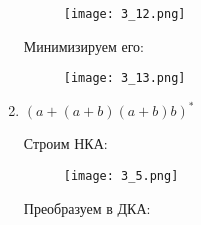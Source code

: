\documentclass[12pt, a4paper]{article}
\begin{document}
\begin{enumerate}
    \begin{figure}[H]
        \centering
        \texttt{[image: 3\_12.png]}
    \end{figure}

Минимизируем его:

\begin{comment}
digraph {
    rankdir="LR"
    "" [shape=point]
    q1 [shape=circle]
    "{q6,q8; q2,q8; q6}" [shape=doublecircle]
    "q3,q7; q5" [shape=circle]
    q4 [shape=circle]

    "" -> q1
    q1 -> "{q6,q8; q2,q8; q6}"  [label="a"]
    "{q6,q8; q2,q8; q6}" -> "q3,q7; q5" [label="a"]
    "q3,q7; q5" -> "{q6,q8; q2,q8; q6}" [label="b"]
    "q3,q7; q5" -> q4 [label="a"]
    q4 -> "q3,q7; q5" [label="b"]
}
\end{comment}

    \begin{figure}[H]
        \centering
        \texttt{[image: 3\_13.png]}
    \end{figure}


    \item \((a+(a+b)(a+b)b)^*\)
    
\begin{comment}
digraph {
    rankdir="LR"
    "" [shape=point]
    q1 [shape=doublecircle]
    q2 [shape=circle]
    q3 [shape=circle]

    "" -> q1
    q1 -> q1 [label="a"]
    q1 -> q2 [label="a,b"]
    q2 -> q3 [label="a,b"]
    q3 -> q1 [label="b"]
}
\end{comment}

Строим НКА:

    \begin{figure}[H]
        \centering
        \texttt{[image: 3\_5.png]}
    \end{figure}
    
Преобразуем в ДКА:

\begin{comment}
digraph {
    rankdir="LR"
    "" [shape=point]
    q1 [shape=doublecircle]
    "{q1,q2}" [shape=doublecircle]
    q2 [shape=circle]
    "{q1,q2,q3}" [shape=doublecircle]
    "{q2,q3}" [shape=circle]
    "{q1,q3}" [shape=doublecircle]
    q3 [shape=circle]

    "" -> q1
    q1 -> "{q1,q2}" [label="a"]
    q1 -> q2 [label="b"]
    "{q1,q2}" -> "{q1,q2,q3}" [label="a"]
    "{q1,q2,q3}" -> "{q1,q2,q3}" [label="a,b"]
    "{q1,q2}" -> "{q2,q3}" [label="b"]
    "{q2,q3}" -> "{q1,q3}" [label="b"]
    "{q2,q3}" -> q3 [label="a"]
    "{q1,q3}" -> "{q1,q2}" [label="a,b"]
    q2 -> q3 [label="a,b"]
    q3 -> q1 [label="b"]
}
\end{comment}


\end{enumerate}
\end{document}

